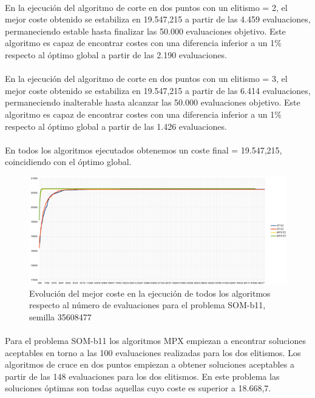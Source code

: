 	\paragraph{}En la ejecución del algoritmo de corte en dos puntos con un elitismo = 2, el mejor coste obtenido se estabiliza en 19.547,215 a partir de las 4.459 evaluaciones, permaneciendo estable hasta finalizar las 50.000 evaluaciones objetivo. Este algoritmo es capaz de encontrar costes con una diferencia inferior a un 1\% respecto al óptimo global a partir de las 2.190 evaluaciones.
	
	\paragraph{}En la ejecución del algoritmo de corte en dos puntos con un elitismo = 3, el mejor coste obtenido se estabiliza en 19.547,215 a partir de las 6.414 evaluaciones, permaneciendo inalterable hasta alcanzar las 50.000 evaluaciones objetivo. Este algoritmo es capaz de encontrar costes con una diferencia inferior a un 1\% respecto al óptimo global a partir de las 1.426 evaluaciones.
	
	\paragraph{}En todos los algoritmos ejecutados obtenemos un coste final = 19.547,215, coincidiendo con el óptimo global.

	\begin{figure}[H]
		\centering
		\includegraphics[scale=0.3]{img/35608477_SOM-b_11_n300_m90.png}
		\caption{Evolución del mejor coste en la ejecución de todos los algoritmos respecto al número de evaluaciones para el problema SOM-b11, semilla 35608477}
		\label{SOM-b_11_historico}
	\end{figure}

	\paragraph{}Para el problema SOM-b11 los algoritmos MPX empiezan a encontrar soluciones aceptables en torno a las 100 evaluaciones realizadas para los dos elitismos. Los algoritmos de cruce en dos puntos empiezan a obtener soluciones aceptables a partir de las 148 evaluaciones para los dos elitismos. En este problema las soluciones óptimas son todas aquellas cuyo coste es superior a 18.668,7.
	
